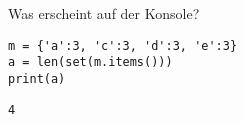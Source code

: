 \question[1] Was erscheint auf der Konsole?
\begin{lstlisting}
m = {'a':3, 'c':3, 'd':3, 'e':3}
a = len(set(m.items()))
print(a)
\end{lstlisting}
\begin{solutionbox}{2cm}
\begin{lstlisting}
4
\end{lstlisting}
\end{solutionbox}
